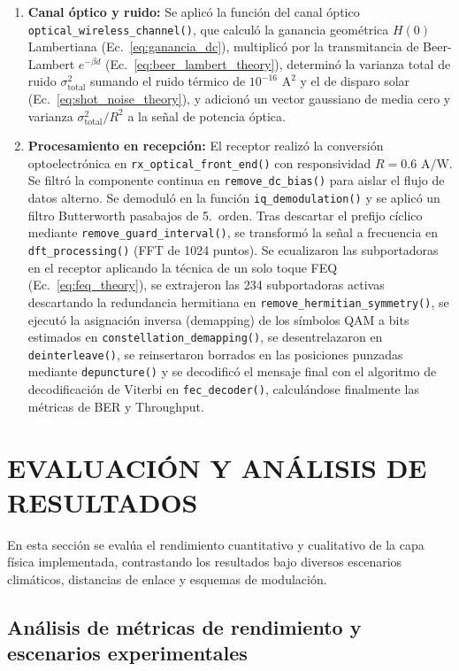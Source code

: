\begin{enumerate}
    \item \textbf{Canal óptico y ruido:} Se aplicó la función del canal óptico \texttt{optical\_wireless\_channel()}, que calculó la ganancia geométrica $H(0)$ Lambertiana (Ec.~\ref{eq:ganancia_dc}), multiplicó por la transmitancia de Beer-Lambert $e^{-\beta d}$ (Ec.~\ref{eq:beer_lambert_theory}), determinó la varianza total de ruido $\sigma^2_{\text{total}}$ sumando el ruido térmico de $10^{-16}\text{~A}^2$ y el de disparo solar (Ec.~\ref{eq:shot_noise_theory}), y adicionó un vector gaussiano de media cero y varianza $\sigma^2_{\text{total}}/R^2$ a la señal de potencia óptica.
    \item \textbf{Procesamiento en recepción:} El receptor realizó la conversión optoelectrónica en \texttt{rx\_optical\_front\_end()} con responsividad $R = 0.6\text{~A/W}$. Se filtró la componente continua en \texttt{remove\_dc\_bias()} para aislar el flujo de datos alterno. Se demoduló en la función \texttt{iq\_demodulation()} y se aplicó un filtro Butterworth pasabajos de 5.\textordmasculine~orden. Tras descartar el prefijo cíclico mediante \texttt{remove\_guard\_interval()}, se transformó la señal a frecuencia en \texttt{dft\_processing()} (FFT de 1024 puntos). Se ecualizaron las subportadoras en el receptor aplicando la técnica de un solo toque FEQ (Ec.~\ref{eq:feq_theory}), se extrajeron las 234 subportadoras activas descartando la redundancia hermitiana en \texttt{remove\_hermitian\_symmetry()}, se ejecutó la asignación inversa (demapping) de los símbolos QAM a bits estimados en \texttt{constellation\_demapping()}, se desentrelazaron en \texttt{deinterleave()}, se reinsertaron borrados en las posiciones punzadas mediante \texttt{depuncture()} y se decodificó el mensaje final con el algoritmo de decodificación de Viterbi en \texttt{fec\_decoder()}, calculándose finalmente las métricas de BER y Throughput.
\end{enumerate}

\section{EVALUACIÓN Y ANÁLISIS DE RESULTADOS}

En esta sección se evalúa el rendimiento cuantitativo y cualitativo de la capa física implementada, contrastando los resultados bajo diversos escenarios climáticos, distancias de enlace y esquemas de modulación.

\subsection{Análisis de métricas de rendimiento y escenarios experimentales}

